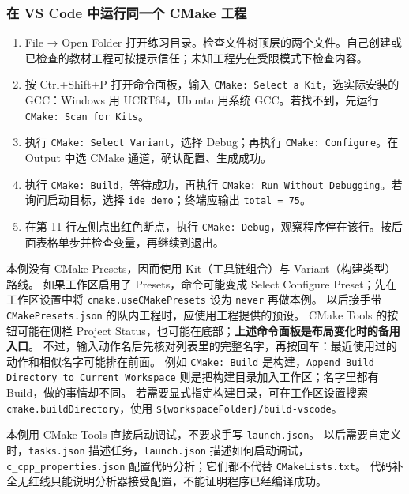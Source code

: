 \subsubsection{在 VS Code 中运行同一个 CMake 工程}
\begin{example}
\begin{enumerate}
\item File → Open Folder 打开练习目录。检查文件树顶层的两个文件。自己创建或已检查的教材工程可按提示信任；未知工程先在受限模式下检查内容。
\item 按 Ctrl+Shift+P 打开命令面板，输入 \texttt{CMake: Select a Kit}，选实际安装的 GCC：Windows 用 UCRT64，Ubuntu 用系统 GCC。若找不到，先运行 \texttt{CMake: Scan for Kits}。
\item 执行 \texttt{CMake: Select Variant}，选择 Debug；再执行 \texttt{CMake: Configure}。在 Output 中选 CMake 通道，确认配置、生成成功。
\item 执行 \texttt{CMake: Build}，等待成功，再执行 \texttt{CMake: Run Without Debugging}。若询问启动目标，选择 \texttt{ide\_demo}；终端应输出 \texttt{total = 75}。
\item 在第 11 行左侧点出红色断点，执行 \texttt{CMake: Debug}，观察程序停在该行。按后面表格单步并检查变量，再继续到退出。
\end{enumerate}
\end{example}

本例没有 CMake Presets，因而使用 Kit（工具链组合）与 Variant（构建类型）路线。
如果工作区启用了 Presets，命令可能变成 Select Configure Preset；先在工作区设置中将 \texttt{cmake.useCMakePresets} 设为 \texttt{never} 再做本例。
以后接手带 \texttt{CMakePresets.json} 的队内工程时，应使用工程提供的预设。
CMake Tools 的按钮可能在侧栏 Project Status，也可能在底部；\textbf{上述命令面板是布局变化时的备用入口}。
不过，输入动作名后先核对列表里的完整名字，再按回车：最近使用过的动作和相似名字可能排在前面。
例如 \texttt{CMake: Build} 是构建，\texttt{Append Build Directory to Current Workspace} 则是把构建目录加入工作区；名字里都有 Build，做的事情却不同。
若需要显式指定构建目录，可在工作区设置搜索 \texttt{cmake.buildDirectory}，使用 \texttt{\$\{workspaceFolder\}/build-vscode}。

\begin{note}
本例用 CMake Tools 直接启动调试，不要求手写 \texttt{launch.json}。
以后需要自定义时，\texttt{tasks.json} 描述任务，\texttt{launch.json} 描述如何启动调试，\texttt{c\_cpp\_properties.json} 配置代码分析；它们都不代替 \texttt{CMakeLists.txt}。
代码补全无红线只能说明分析器接受配置，不能证明程序已经编译成功。
\end{note}

